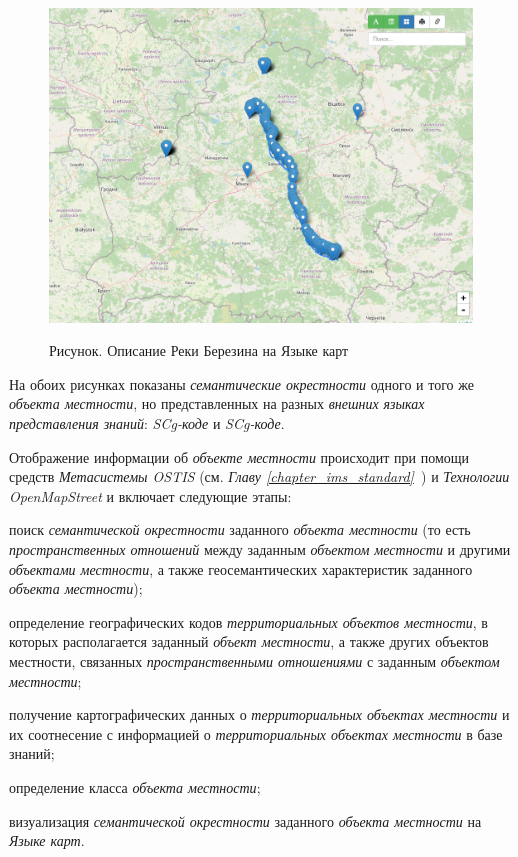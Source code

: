 \begin{figure}[H]
	\caption{Рисунок. Описание Реки Березина на Языке карт}
	\includegraphics[scale=0.45]{author/part7/figures/berezina_map.png}
	\label{fig:gis_map_berezina_map_format}
\end{figure}

На обоих рисунках показаны \textit{семантические окрестности} одного и того же \textit{объекта местности}, но представленных на разных \textit{внешних языках представления знаний}: \textit{SCg-коде} и \textit{SCg-коде}.

Отображение информации об \textit{объекте местности} происходит при помощи средств \textit{Метасистемы OSTIS} (см. \textit{Главу \ref{chapter_ims_standard}~}) и  \textit{Технологии OpenMapStreet} и включает следующие этапы:
\begin{textitemize}
	\item поиск \textit{семантической окрестности} заданного \textit{объекта местности} (то есть \textit{пространственных отношений} между заданным \textit{объектом местности} и другими \textit{объектами местности}, а также геосемантических характеристик заданного \textit{объекта местности});
	\item определение географических кодов \textit{территориальных объектов местности}, в которых располагается заданный \textit{объект местности}, а также других объектов местности, связанных \textit{пространственными отношениями} с заданным \textit{объектом местности};
	\item получение картографических данных о \textit{территориальных объектах местности} и их соотнесение с информацией о \textit{территориальных объектах местности} в базе знаний;
	\item определение класса \textit{объекта местности};
	\item визуализация \textit{семантической окрестности} заданного \textit{объекта местности} на \textit{Языке карт}.
\end{textitemize}

